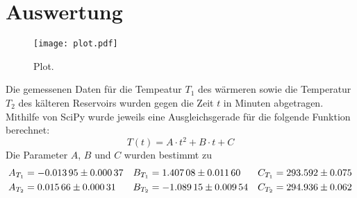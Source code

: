 \section{Auswertung}
\label{sec:Auswertung}

\begin{figure}
  \centering
  \texttt{[image: plot.pdf]}
  \caption{Plot.}
  \label{fig:plot}
\end{figure}
Die gemessenen Daten für die Tempeatur $T_1$ des wärmeren sowie die Temperatur
$T_2$ des kälteren Reservoirs wurden gegen die Zeit $t$ in Minuten abgetragen.
Mithilfe von SciPy wurde jeweils eine Ausgleichsgerade für die folgende Funktion
berechnet:
\begin{equation}
  T(t)=A \cdot t^2 + B \cdot t + C
\end{equation}
Die Parameter $A$, $B$ und $C$ wurden bestimmt zu
\begin{align}
  A_{T_1} &= \num{-0,01395 +- 0.00037} & B_{T_1} &= \num{1,40708 +- 0.01160} & C_{T_1} &= \num{293,592 +- 0.075} \\
  A_{T_2} &= \num{0,01566 +- 0.00031}  & B_{T_2} &= \num{-1,08915 +- 0.00954} & C_{T_2} &= \num{294,936 +- 0.062}
\end{align}

